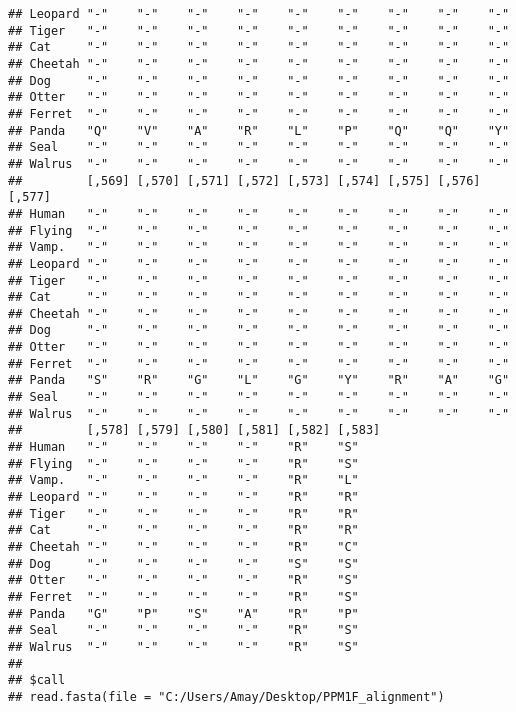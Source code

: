 \documentclass[]{article}
\begin{document}
\begin{verbatim}
## Leopard "-"    "-"    "-"    "-"    "-"    "-"    "-"    "-"    "-"   
## Tiger   "-"    "-"    "-"    "-"    "-"    "-"    "-"    "-"    "-"   
## Cat     "-"    "-"    "-"    "-"    "-"    "-"    "-"    "-"    "-"   
## Cheetah "-"    "-"    "-"    "-"    "-"    "-"    "-"    "-"    "-"   
## Dog     "-"    "-"    "-"    "-"    "-"    "-"    "-"    "-"    "-"   
## Otter   "-"    "-"    "-"    "-"    "-"    "-"    "-"    "-"    "-"   
## Ferret  "-"    "-"    "-"    "-"    "-"    "-"    "-"    "-"    "-"   
## Panda   "Q"    "V"    "A"    "R"    "L"    "P"    "Q"    "Q"    "Y"   
## Seal    "-"    "-"    "-"    "-"    "-"    "-"    "-"    "-"    "-"   
## Walrus  "-"    "-"    "-"    "-"    "-"    "-"    "-"    "-"    "-"   
##         [,569] [,570] [,571] [,572] [,573] [,574] [,575] [,576] [,577]
## Human   "-"    "-"    "-"    "-"    "-"    "-"    "-"    "-"    "-"   
## Flying  "-"    "-"    "-"    "-"    "-"    "-"    "-"    "-"    "-"   
## Vamp.   "-"    "-"    "-"    "-"    "-"    "-"    "-"    "-"    "-"   
## Leopard "-"    "-"    "-"    "-"    "-"    "-"    "-"    "-"    "-"   
## Tiger   "-"    "-"    "-"    "-"    "-"    "-"    "-"    "-"    "-"   
## Cat     "-"    "-"    "-"    "-"    "-"    "-"    "-"    "-"    "-"   
## Cheetah "-"    "-"    "-"    "-"    "-"    "-"    "-"    "-"    "-"   
## Dog     "-"    "-"    "-"    "-"    "-"    "-"    "-"    "-"    "-"   
## Otter   "-"    "-"    "-"    "-"    "-"    "-"    "-"    "-"    "-"   
## Ferret  "-"    "-"    "-"    "-"    "-"    "-"    "-"    "-"    "-"   
## Panda   "S"    "R"    "G"    "L"    "G"    "Y"    "R"    "A"    "G"   
## Seal    "-"    "-"    "-"    "-"    "-"    "-"    "-"    "-"    "-"   
## Walrus  "-"    "-"    "-"    "-"    "-"    "-"    "-"    "-"    "-"   
##         [,578] [,579] [,580] [,581] [,582] [,583]
## Human   "-"    "-"    "-"    "-"    "R"    "S"   
## Flying  "-"    "-"    "-"    "-"    "R"    "S"   
## Vamp.   "-"    "-"    "-"    "-"    "R"    "L"   
## Leopard "-"    "-"    "-"    "-"    "R"    "R"   
## Tiger   "-"    "-"    "-"    "-"    "R"    "R"   
## Cat     "-"    "-"    "-"    "-"    "R"    "R"   
## Cheetah "-"    "-"    "-"    "-"    "R"    "C"   
## Dog     "-"    "-"    "-"    "-"    "S"    "S"   
## Otter   "-"    "-"    "-"    "-"    "R"    "S"   
## Ferret  "-"    "-"    "-"    "-"    "R"    "S"   
## Panda   "G"    "P"    "S"    "A"    "R"    "P"   
## Seal    "-"    "-"    "-"    "-"    "R"    "S"   
## Walrus  "-"    "-"    "-"    "-"    "R"    "S"   
## 
## $call
## read.fasta(file = "C:/Users/Amay/Desktop/PPM1F_alignment")
\end{verbatim}
\end{document}
